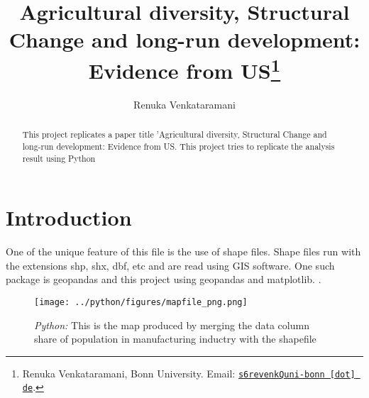 \documentclass[11pt, a4paper, leqno]{article}
\begin{document}
\title{Agricultural diversity, Structural Change and long-run development: Evidence from US\thanks{Renuka Venkataramani, Bonn University. Email: \href{mailto:s6revenkQuni-bonn.de}{\nolinkurl{s6revenkQuni-bonn [dot] de}}.}}

\author{Renuka Venkataramani}


\maketitle


\begin{abstract}
    This project replicates a paper title 'Agricultural diversity, Structural Change and long-run development: Evidence from US.
    This project tries to replicate the analysis result using Python
    \citet{fiszbein2022agricultural}
\end{abstract}

\clearpage


\section{Introduction} %
\label{sec:introduction}

One of the unique feature of this file is the use of shape files. Shape files run with the extensions shp, shx, dbf, etc and are read using GIS software.
One such package is geopandas and this project using geopandas and matplotlib.
\citet{GaudeckerEconProjectTemplates}.




\begin{figure}[H]

    \centering
    \texttt{[image: ../python/figures/mapfile\_png.png]}

    \caption{\emph{Python:} This is the map produced by merging the data column share of population in manufacturing
    inductry with the shapefile}
    \label{fig:Mapfile: Share of population in the manufacturing industry}

\end{figure}
\end{document}
